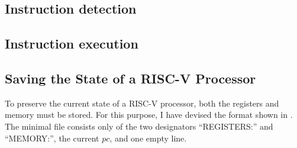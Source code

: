 \subsection{Instruction detection}
\subsection{Instruction execution}

\subsection{Saving the State of a RISC-V
      Processor}\label{sub:statefile}

To preserve the current state of a RISC-V processor, both the
registers and memory must be stored. For this purpose, I have devised
the format shown in . The minimal file consists
only of the two designators \enquote{REGISTERS:} and
\enquote{MEMORY:}, the current $pc$, and one empty line.

